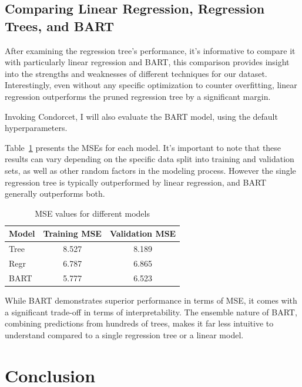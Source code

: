 \documentclass[12pt]{article}
\begin{document}
\subsection{Comparing Linear Regression, Regression Trees, and BART}

After examining the regression tree's performance, it's informative to compare it with particularly linear regression and BART, this comparison provides insight into the strengths and weaknesses of different techniques for our dataset. Interestingly, even without any specific optimization to counter overfitting, linear regression outperforms the pruned regression tree by a significant margin.

Invoking Condorcet, I will also evaluate the BART model, using the default hyperparameters.

Table~\ref{big_comparison} presents the MSEs for each model. It's important to note that these results can vary depending on the specific data split into training and validation sets, as well as other random factors in the modeling process. However the single regression tree is typically outperformed by linear regression, and BART generally outperforms both.

\begin{table}
    \centering
    \begin{tabular}{| l | c | c |}
        \hline
        Model & Training MSE & Validation MSE \\
        \hline
        Tree  & 8.527        & 8.189          \\
        Regr  & 6.787        & 6.865          \\
        BART  & 5.777        & 6.523          \\
        \hline
    \end{tabular}
    \caption{MSE values for different models}
    \label{big_comparison}
\end{table}

While BART demonstrates superior performance in terms of MSE, it comes with a significant trade-off in terms of interpretability. The ensemble nature of BART, combining predictions from hundreds of trees, makes it far less intuitive to understand compared to a single regression tree or a linear model.


\section{Conclusion}
\end{document}
